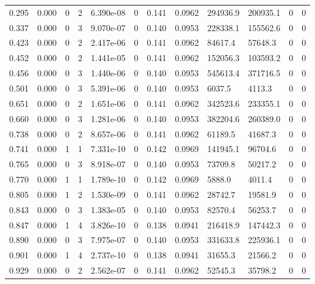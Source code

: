 \documentclass[preview]{standalone}
\begin{document}
{{\begin{tabular}{L{1.2cm}C{1.2cm} C{0.3cm}C{0.5cm} C{1.4cm}C{1.4cm} C{1.4cm}C{1.4cm} C{1.6cm}C{1.6cm} C{1.6cm}C{1.6cm}}
  0.295  &  0.000  & 0     &  2 &  6.390e-08  & 0  &  0.141&   0.0962& 294936.9 & 200935.1   &  0 & 0  \\ 
  0.337  &  0.000  & 0     &  3 &  9.070e-07  & 0  &  0.140&   0.0953& 228338.1 & 155562.6   &  0 & 0  \\ 
  0.423  &  0.000  & 0     &  2 &  2.417e-06  & 0  &  0.141&   0.0962& 84617.4 & 57648.3   &  0 & 0  \\ 
  0.452  &  0.000  & 0     &  2 &  1.441e-05  & 0  &  0.141&   0.0962& 152056.3 & 103593.2   &  0 & 0  \\ 
  0.456  &  0.000  & 0     &  3 &  1.440e-06  & 0  &  0.140&   0.0953& 545613.4 & 371716.5   &  0 & 0  \\ 
  0.501  &  0.000  & 0     &  3 &  5.391e-06  & 0  &  0.140&   0.0953& 6037.5 & 4113.3   &  0 & 0  \\ 
  0.651  &  0.000  & 0     &  2 &  1.651e-06  & 0  &  0.141&   0.0962& 342523.6 & 233355.1   &  0 & 0  \\ 
  0.660  &  0.000  & 0     &  3 &  1.281e-06  & 0  &  0.140&   0.0953& 382204.6 & 260389.0   &  0 & 0  \\ 
  0.738  &  0.000  & 0     &  2 &  8.657e-06  & 0  &  0.141&   0.0962& 61189.5 & 41687.3   &  0 & 0  \\ 
  0.741  &  0.000  & 1     &  1 &  7.331e-10  & 0  &  0.142&   0.0969& 141945.1 & 96704.6   &  0 & 0  \\ 
  0.765  &  0.000  & 0     &  3 &  8.918e-07  & 0  &  0.140&   0.0953& 73709.8 & 50217.2   &  0 & 0  \\ 
  0.770  &  0.000  & 1     &  1 &  1.789e-10  & 0  &  0.142&   0.0969& 5888.0 & 4011.4   &  0 & 0  \\ 
  0.805  &  0.000  & 1     &  2 &  1.530e-09  & 0  &  0.141&   0.0962& 28742.7 & 19581.9   &  0 & 0  \\ 
  0.843  &  0.000  & 0     &  3 &  1.383e-05  & 0  &  0.140&   0.0953& 82570.4 & 56253.7   &  0 & 0  \\ 
  0.847  &  0.000  & 1     &  4 &  3.826e-10  & 0  &  0.138&   0.0941& 216418.9 & 147442.3   &  0 & 0  \\ 
  0.890  &  0.000  & 0     &  3 &  7.975e-07  & 0  &  0.140&   0.0953& 331633.8 & 225936.1   &  0 & 0  \\ 
  0.901  &  0.000  & 1     &  4 &  2.737e-10  & 0  &  0.138&   0.0941& 31655.3 & 21566.2   &  0 & 0  \\ 
  0.929  &  0.000  & 0     &  2 &  2.562e-07  & 0  &  0.141&   0.0962& 52545.3 & 35798.2   &  0 & 0  \\ 

\end{tabular}}}
\end{document}

